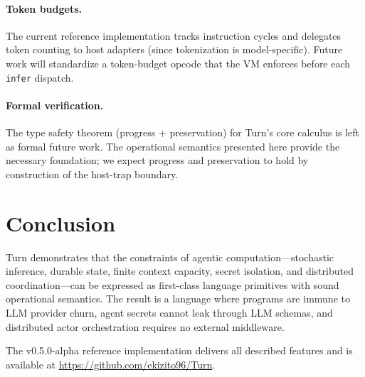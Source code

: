 \documentclass[sigplan,10pt,review,anonymous]{acmart}
\begin{document}
\paragraph{Token budgets.}
The current reference implementation tracks instruction cycles and delegates
token counting to host adapters (since tokenization is model-specific). Future
work will standardize a token-budget opcode that the VM enforces before each
\texttt{infer} dispatch.

\paragraph{Formal verification.}
The type safety theorem (progress + preservation) for Turn's core calculus is
left as formal future work. The operational semantics presented here provide
the necessary foundation; we expect progress and preservation to hold by
construction of the host-trap boundary.

\section{Conclusion}

Turn demonstrates that the constraints of agentic computation—stochastic
inference, durable state, finite context capacity, secret isolation, and
distributed coordination—can be expressed as first-class language primitives
with sound operational semantics. The result is a language where programs are
immune to LLM provider churn, agent secrets cannot leak through LLM schemas,
and distributed actor orchestration requires no external middleware.

The v0.5.0-alpha reference implementation delivers all described features and
is available at \url{https://github.com/ekizito96/Turn}.
\end{document}
